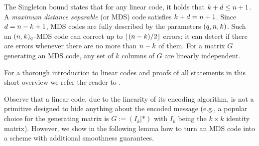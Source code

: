 The Singleton bound states that for any linear code, it holds that $k+d \leq n+1$. 
A \emph{maximum distance separable} (or MDS) code satisfies $k+d = n+1$. 
Since $d = n-k+1$, MDS codes are fully described by the parameters $(q,n,k)$.
Such an $(n,k)_q$-MDS code can
correct up to $\lfloor (n-k)/2\rfloor$ errors; it can detect if there are errors whenever there are no more than $n-k$ of them. 
For a matrix $G$ generating an MDS code, any set of $k$ columns of $G$ are linearly independent.

For a thorough introduction to linear codes and proofs of all statements in this short overview we refer the reader to \cite{Roth:2006:ICT:1137784}.

Observe that a linear code, due to the linearity of its encoding algorithm, is not a primitive designed to hide anything about the encoded message (e.g., a popular choice for the generating matrix is $G:=(I_k|\ast)$ with $I_k$ being the $k\times k$ identity matrix). However, we show in the following lemma how to turn an MDS code into a \RSS scheme with additional smoothness guarantees.


%
%

